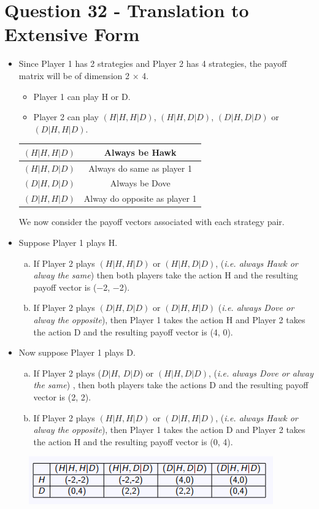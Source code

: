 \documentclass[]{report}
\begin{document}
\section*{Question 32 - Translation to Extensive Form}
\begin{itemize}
	\item Since Player 1 has 2 strategies and Player 2 has 4 strategies, the
	payoff matrix will be of dimension 2 × 4.
\begin{itemize}	
\item   Player 1 can play H or D.
\item	Player 2 can play $(H|H, H|D)$, $(H|H, D|D)$, $(D|H, D|D)$ or
	$(D|H, H|D)$.
\end{itemize}
\begin{center}
\begin{tabular}{|c|c|} \hline
	$(H|H, H|D)$& Always be Hawk \\ \hline 
	$(H|H, D|D)$& Always do same as player 1 \\ \hline 
	$(D|H, D|D)$& Always be Dove \\ \hline 
	$(D|H, H|D)$& Alway do opposite as player 1\\ \hline 
\end{tabular}		
\end{center}
	We now consider the payoff vectors associated with each strategy
	pair.
	
\item Suppose Player 1 plays H.
\begin{enumerate}[(a)]
\item If Player 2 plays $(H|H, H|D)$ or $(H|H, D|D)$, 
    (\textit{i.e. always Hawk or alway the same}) then both players
	take the action H and the resulting payoff vector is (−2, −2).
\item If Player 2 plays $(D|H, D|D)$ or $(D|H, H|D)$
(\textit{i.e. always Dove or alway the opposite}), then Player 1
	takes the action H and Player 2 takes the action D and the
	resulting payoff vector is (4, 0).
\end{enumerate}
\item Now suppose Player 1 plays D.
\begin{enumerate}[(a)]
	\item If Player 2 plays ($D|H$, $D|D$) or $(H|H, D|D)$, 
	(\textit{i.e. always Dove or alway the same}) , then both players
	take the actions D and the resulting payoff vector is (2, 2).
\item If Player 2 plays $(H|H, H|D)$ or $(D|H, H|D)$,
   (\textit{i.e. always Hawk or alway the opposite}), then Player 1 takes
	the action D and Player 2 takes the action H and the resulting
	payoff vector is (0, 4).
	\end{enumerate}
\end{itemize}
\begin{figure}[h!]
\centering
\includegraphics[width=0.7\linewidth]{Q32-matrix}
\caption{}
\label{fig:q32-matrix}
\end{figure}
\end{document}
